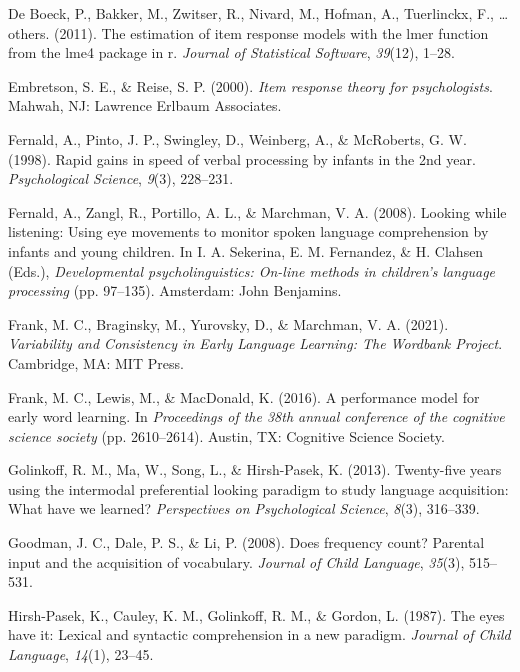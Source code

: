 \documentclass[10pt, letterpaper]{article}
\begin{document}
\leavevmode\hypertarget{ref-de-boeck2011}{}%
De Boeck, P., Bakker, M., Zwitser, R., Nivard, M., Hofman, A.,
Tuerlinckx, F., \ldots{} others. (2011). The estimation of item response
models with the lmer function from the lme4 package in r. \emph{Journal
of Statistical Software}, \emph{39}(12), 1--28.

\leavevmode\hypertarget{ref-embretson2000}{}%
Embretson, S. E., \& Reise, S. P. (2000). \emph{Item response theory for
psychologists}. Mahwah, NJ: Lawrence Erlbaum Associates.

\leavevmode\hypertarget{ref-fernald1998}{}%
Fernald, A., Pinto, J. P., Swingley, D., Weinberg, A., \& McRoberts, G.
W. (1998). Rapid gains in speed of verbal processing by infants in the
2nd year. \emph{Psychological Science}, \emph{9}(3), 228--231.

\leavevmode\hypertarget{ref-Fernald2008}{}%
Fernald, A., Zangl, R., Portillo, A. L., \& Marchman, V. A. (2008).
Looking while listening: Using eye movements to monitor spoken language
comprehension by infants and young children. In I. A. Sekerina, E. M.
Fernandez, \& H. Clahsen (Eds.), \emph{Developmental psycholinguistics:
On-line methods in children's language processing} (pp. 97--135).
Amsterdam: John Benjamins.

\leavevmode\hypertarget{ref-frank2021}{}%
Frank, M. C., Braginsky, M., Yurovsky, D., \& Marchman, V. A. (2021).
\emph{Variability and Consistency in Early Language Learning: The
Wordbank Project}. Cambridge, MA: MIT Press.

\leavevmode\hypertarget{ref-frank2016b}{}%
Frank, M. C., Lewis, M., \& MacDonald, K. (2016). A performance model
for early word learning. In \emph{Proceedings of the 38th annual
conference of the cognitive science society} (pp. 2610--2614). Austin,
TX: Cognitive Science Society.

\leavevmode\hypertarget{ref-Golinkoff2013}{}%
Golinkoff, R. M., Ma, W., Song, L., \& Hirsh-Pasek, K. (2013).
Twenty-five years using the intermodal preferential looking paradigm to
study language acquisition: What have we learned? \emph{Perspectives on
Psychological Science}, \emph{8}(3), 316--339.

\leavevmode\hypertarget{ref-Goodman2008}{}%
Goodman, J. C., Dale, P. S., \& Li, P. (2008). Does frequency count?
Parental input and the acquisition of vocabulary. \emph{Journal of Child
Language}, \emph{35}(3), 515--531.

\leavevmode\hypertarget{ref-Hirsh-Pasek1987}{}%
Hirsh-Pasek, K., Cauley, K. M., Golinkoff, R. M., \& Gordon, L. (1987).
The eyes have it: Lexical and syntactic comprehension in a new paradigm.
\emph{Journal of Child Language}, \emph{14}(1), 23--45.
\end{document}
